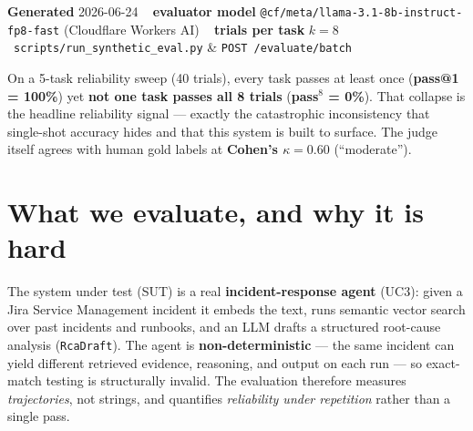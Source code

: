 \documentclass[11pt]{article}
\newcommand{\dt}{\,\textperiodcentered\,}
\begin{document}
\thispagestyle{empty}


\vspace{4pt}
{\small\color{slate}\textbf{Generated} 2026-06-24 \dt\ \textbf{evaluator model} \texttt{@cf/meta/llama-3.1-8b-instruct-fp8-fast} (Cloudflare Workers AI) \dt\ \textbf{trials per task} $k=8$ \dt\ \texttt{scripts/run\_synthetic\_eval.py} \& \texttt{POST /evaluate/batch}}

\vspace{6pt}
\begin{keybox}
On a 5-task reliability sweep (40 trials), every task passes at least once
(\textbf{pass@1 = 100\%}) yet \textbf{not one task passes all 8 trials} (\textbf{pass$^{8}$ = 0\%}).
That collapse is the headline reliability signal --- exactly the catastrophic
inconsistency that single-shot accuracy hides and that this system is built to surface.
The judge itself agrees with human gold labels at \textbf{Cohen's $\kappa = 0.60$} (``moderate'').
\end{keybox}

\section{What we evaluate, and why it is hard}
The system under test (SUT) is a real \textbf{incident-response agent} (UC3): given a
Jira Service Management incident it embeds the text, runs semantic vector search over
past incidents and runbooks, and an LLM drafts a structured root-cause analysis
(\texttt{RcaDraft}). The agent is \textbf{non-deterministic} --- the same incident can
yield different retrieved evidence, reasoning, and output on each run --- so exact-match
testing is structurally invalid. The evaluation therefore measures \emph{trajectories},
not strings, and quantifies \emph{reliability under repetition} rather than a single pass.
\end{document}
